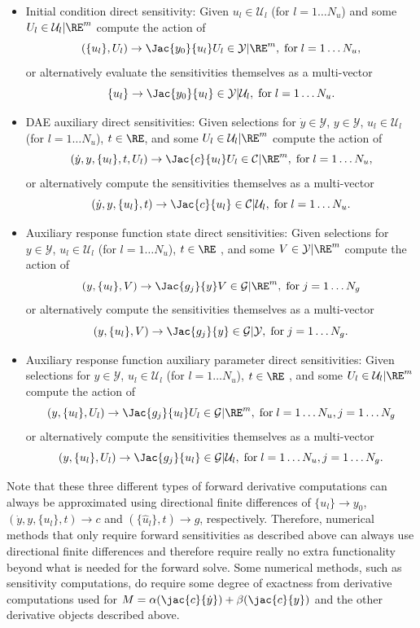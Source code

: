 \documentclass[pdf,ps2pdf,11pt]{SANDreport}
\begin{document}
\begin{itemize}

{}\item Initial condition direct sensitivity: Given $u_l\in\mathcal{U}_l$ (for
$l=1\ldots{}N_u$) and some $U_l\in\mathcal{U}_l|\RE^m$ compute the action of
\[
(\{u_l\},U_l) {}\rightarrow \Jac{y_0}{u_l} U_l \in \mathcal{Y}|\RE^m,
\; \mbox{for} \; l = 1 {}\ldots N_u,
\]
or alternatively evaluate the sensitivities themselves as a multi-vector
\[
\{u_l\} {}\rightarrow \Jac{y_0}{u_l} \in \mathcal{Y}|\mathcal{U}_l,
\; \mbox{for} \; l = 1 {}\ldots N_u.
\]

{}\item DAE auxiliary direct sensitivities: Given selections for
$\dot{y}\in\mathcal{Y}$, $y\in\mathcal{Y}$, $u_l\in\mathcal{U}_l$ (for
$l=1\ldots{}N_u$), $t\in\RE$, and some $U_l\in\mathcal{U}_l|\RE^m$ compute
the action of
\[
(\dot{y},y,\{u_l\},t,U_l) {}\rightarrow \Jac{c}{u_l} U_l \in \mathcal{C}|\RE^m,
\; \mbox{for} \; l = 1 {}\ldots N_u,
\]
or alternatively compute the sensitivities themselves as a multi-vector
\[
(\dot{y},y,\{u_l\},t) {}\rightarrow \Jac{c}{u_l} \in \mathcal{C}|\mathcal{U}_l,
\; \mbox{for} \; l = 1 {}\ldots N_u.
\]

{}\item Auxiliary response function state direct sensitivities: Given
selections for $y\in\mathcal{Y}$, $u_l\in\mathcal{U}_l$ (for
$l=1\ldots{}N_u$), $t\in\RE$ , and some $V\in\mathcal{Y}|\RE^m$
compute the action of
\[
(y,\{u_l\},V) {}\rightarrow \Jac{g_j}{y} V \in \mathcal{G}|\RE^m,
\; \mbox{for} \; j = 1 \ldots N_g
\]
or alternatively compute the sensitivities themselves as a multi-vector
\[
(y,\{u_l\},V) {}\rightarrow \Jac{g_j}{y} \in \mathcal{G}|\mathcal{Y},
\; \mbox{for} \; j = 1 \ldots N_g.
\]

{}\item Auxiliary response function auxiliary parameter direct
sensitivities: Given selections for $y\in\mathcal{Y}$,
$u_l\in\mathcal{U}_l$ (for $l=1\ldots{}N_u$), $t\in\RE$ , and some
$U_l\in\mathcal{U}_l|\RE^m$ compute the action of
\[
(y,\{u_l\},U_l) {}\rightarrow \Jac{g_j}{u_l} U_l \in \mathcal{G}|\RE^m,
\; \mbox{for} \; l = 1 {}\ldots N_u, j = 1 \ldots N_g
\]
or alternatively compute the sensitivities themselves as a multi-vector
\[
(y,\{u_l\},U_l) {}\rightarrow \Jac{g_j}{u_l} \in \mathcal{G}|\mathcal{U}_l,
\; \mbox{for} \; l = 1 {}\ldots N_u, j = 1 \ldots N_g.
\]

\end{itemize}

Note that these three different types of forward derivative computations can
always be approximated using directional finite differences of $\{u_l\}
{}\rightarrow y_0$, $(\dot{y},y,\{u_l\},t) {}\rightarrow c$ and
$(\{\hat{u}_l\},t) {}\rightarrow g$, respectively.  Therefore, numerical
methods that only require forward sensitivities as described above can always
use directional finite differences and therefore require really no extra
functionality beyond what is needed for the forward solve.  Some numerical
methods, such as sensitivity computations, do require some degree of exactness
from derivative computations used for $M = {}\alpha (\jac{c}{\dot{y}}) +
{}\beta (\jac{c}{y})$ and the other derivative objects described above.
\end{document}
